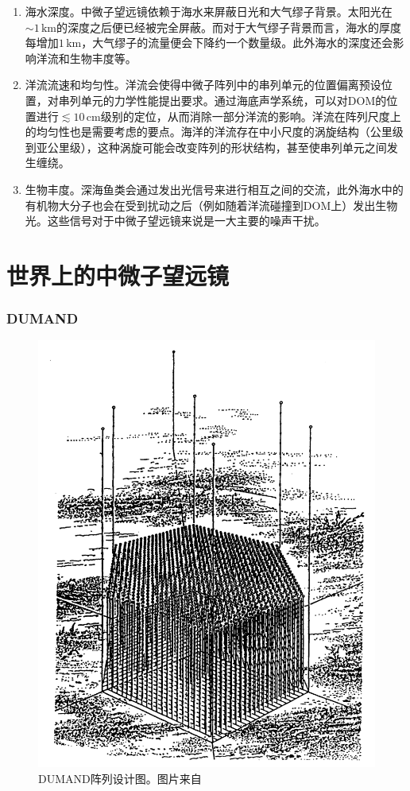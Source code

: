 \begin{enumerate}
    \item 海水深度。中微子望远镜依赖于海水来屏蔽日光和大气缪子背景。太阳光在$\sim 1\,\mathrm{km}$的深度之后便已经被完全屏蔽。而对于大气缪子背景而言，海水的厚度每增加$1\,\mathrm{km}$，大气缪子的流量便会下降约一个数量级\cite{atmos_muon_depth:1998, KM3NeT_atmos_muon:2019}。此外海水的深度还会影响洋流和生物丰度等。

    \item 洋流流速和均匀性。洋流会使得中微子阵列中的串列单元的位置偏离预设位置，对串列单元的力学性能提出要求。通过海底声学系统，可以对DOM的位置进行$\lesssim 10\, \mathrm{cm}$级别的定位\cite{KM3NeT_acoustic_1:2022, KM3NeT_acoustic_2:2022, Baikal_acoustic:2021}，从而消除一部分洋流的影响。洋流在阵列尺度上的均匀性也是需要考虑的要点。海洋的洋流存在中小尺度的涡旋结构（公里级到亚公里级）\cite{current_simulation:2017}，这种涡旋可能会改变阵列的形状结构，甚至使串列单元之间发生缠绕。

    \item 生物丰度。深海鱼类会通过发出光信号来进行相互之间的交流，此外海水中的有机物大分子也会在受到扰动之后（例如随着洋流碰撞到DOM上）发出生物光\cite{biolumi_modeling:2021}。这些信号对于中微子望远镜来说是一大主要的噪声干扰\cite{ANTARES_biolumi:2021, Baikal_biolumi:2021}。
\end{enumerate}

\section{世界上的中微子望远镜}

\subsubsection*{DUMAND}

\begin{figure}[htb]
    \centering
    \includegraphics[width=0.65\linewidth]{img/DUMAND.png}
    \caption{DUMAND阵列设计图。图片来自\parencite{DUMAND:1992}}
    \label{fig:DUMAND}
\end{figure}

